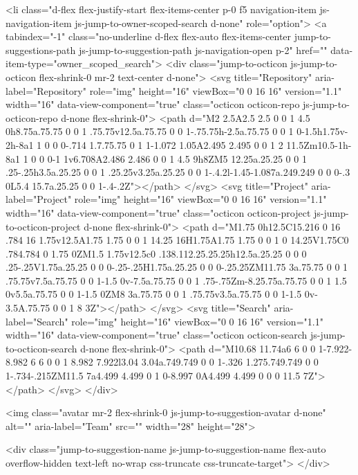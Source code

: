 <li class="d-flex flex-justify-start flex-items-center p-0 f5 navigation-item js-navigation-item js-jump-to-owner-scoped-search d-none" role="option">
  <a tabindex="-1" class="no-underline d-flex flex-auto flex-items-center jump-to-suggestions-path js-jump-to-suggestion-path js-navigation-open p-2" href="" data-item-type="owner_scoped_search">
    <div class="jump-to-octicon js-jump-to-octicon flex-shrink-0 mr-2 text-center d-none">
      <svg title="Repository" aria-label="Repository" role="img" height="16" viewBox="0 0 16 16" version="1.1" width="16" data-view-component="true" class="octicon octicon-repo js-jump-to-octicon-repo d-none flex-shrink-0">
    <path d="M2 2.5A2.5 2.5 0 0 1 4.5 0h8.75a.75.75 0 0 1 .75.75v12.5a.75.75 0 0 1-.75.75h-2.5a.75.75 0 0 1 0-1.5h1.75v-2h-8a1 1 0 0 0-.714 1.7.75.75 0 1 1-1.072 1.05A2.495 2.495 0 0 1 2 11.5Zm10.5-1h-8a1 1 0 0 0-1 1v6.708A2.486 2.486 0 0 1 4.5 9h8ZM5 12.25a.25.25 0 0 1 .25-.25h3.5a.25.25 0 0 1 .25.25v3.25a.25.25 0 0 1-.4.2l-1.45-1.087a.249.249 0 0 0-.3 0L5.4 15.7a.25.25 0 0 1-.4-.2Z"></path>
</svg>
      <svg title="Project" aria-label="Project" role="img" height="16" viewBox="0 0 16 16" version="1.1" width="16" data-view-component="true" class="octicon octicon-project js-jump-to-octicon-project d-none flex-shrink-0">
    <path d="M1.75 0h12.5C15.216 0 16 .784 16 1.75v12.5A1.75 1.75 0 0 1 14.25 16H1.75A1.75 1.75 0 0 1 0 14.25V1.75C0 .784.784 0 1.75 0ZM1.5 1.75v12.5c0 .138.112.25.25.25h12.5a.25.25 0 0 0 .25-.25V1.75a.25.25 0 0 0-.25-.25H1.75a.25.25 0 0 0-.25.25ZM11.75 3a.75.75 0 0 1 .75.75v7.5a.75.75 0 0 1-1.5 0v-7.5a.75.75 0 0 1 .75-.75Zm-8.25.75a.75.75 0 0 1 1.5 0v5.5a.75.75 0 0 1-1.5 0ZM8 3a.75.75 0 0 1 .75.75v3.5a.75.75 0 0 1-1.5 0v-3.5A.75.75 0 0 1 8 3Z"></path>
</svg>
      <svg title="Search" aria-label="Search" role="img" height="16" viewBox="0 0 16 16" version="1.1" width="16" data-view-component="true" class="octicon octicon-search js-jump-to-octicon-search d-none flex-shrink-0">
    <path d="M10.68 11.74a6 6 0 0 1-7.922-8.982 6 6 0 0 1 8.982 7.922l3.04 3.04a.749.749 0 0 1-.326 1.275.749.749 0 0 1-.734-.215ZM11.5 7a4.499 4.499 0 1 0-8.997 0A4.499 4.499 0 0 0 11.5 7Z"></path>
</svg>
    </div>

    <img class="avatar mr-2 flex-shrink-0 js-jump-to-suggestion-avatar d-none" alt="" aria-label="Team" src="" width="28" height="28">

    <div class="jump-to-suggestion-name js-jump-to-suggestion-name flex-auto overflow-hidden text-left no-wrap css-truncate css-truncate-target">
    </div>

